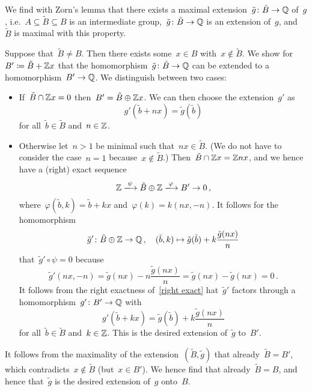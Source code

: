 We find with Zorn’s lemma that there exists a maximal extension~$\tilde{g} \colon \tilde{B} \to \mathbb{Q}$ of~$g$, i.e.~$A \subseteq \tilde{B} \subseteq B$ is an intermediate group,~$\tilde{g} \colon \tilde{B} \to \mathbb{Q}$ is an extension of~$g$, and~$\tilde{B}$ is maximal with this property.

Suppose that~$\tilde{B} \neq B$.
Then there exists some~$x \in B$ with~$x \notin \tilde{B}$.
We show for~$B' \coloneqq \tilde{B} + \mathbb{Z} x$ that the homomorphism~$\tilde{g} \colon \tilde{B} \to \mathbb{Q}$ can be extended to a homomorphism~$B' \to \mathbb{Q}$.
We distinguish between two cases:
\begin{itemize}
  \item
    If~$\tilde{B} \cap \mathbb{Z} x = 0$ then~$B' = \tilde{B} \oplus \mathbb{Z} x$.
    We can then choose the extension~$g'$ as
    \[
        g'(\tilde{b} + nx)
      = \tilde{g}(\tilde{b})
    \]
    for all~$\tilde{b} \in \tilde{B}$ and~$n \in \mathbb{Z}$.
  \item
    Otherwise let~$n > 1$ be minimal such that~$nx \in \tilde{B}$.
    (We do not have to consider the case~$n = 1$ because~$x \notin \tilde{B}$.)
    Then~$\tilde{B} \cap \mathbb{Z} x = \mathbb{Z} nx$, and we hence have a (right) exact sequence
    \begin{equation}
      \label{right exact}
      \Integer
      \xlongto{\psi}
      \tilde{B} \oplus \Integer
      \xlongto{\varphi}
      B'
      \to
      0 \,,
    \end{equation}
    where~$\varphi(\tilde{b},k) = \tilde{b}+kx$ and~$\varphi(k) = k(nx,-n)$.
    It follows for the homomorphism
    \[
      \tilde{g}'
      \colon
      \tilde{B} \oplus \mathbb{Z}
      \to
      \mathbb{Q} \,,
      \quad
      (\tilde{b},k)
      \mapsto
      \tilde{g}(\tilde{b}) + k \frac{\tilde{g}(nx)}{n}
    \]
    that~$\tilde{g}' \circ \psi = 0$ because
    \[
      \tilde{g}'(nx,-n)
      =
      \tilde{g}(nx) - n \frac{\tilde{g}(nx)}{n}
      =
      \tilde{g}(nx) - \tilde{g}(nx)
      =
      0 \,.
    \]
    It follows from the right exactness of~\eqref{right exact} hat~$\tilde{g}'$ factors through a homomorphism~$g' \colon B' \to \mathbb{Q}$ with
    \[
      g'(\tilde{b} + kx)
      =
      \tilde{g}(\tilde{b}) + k \frac{\tilde{g}(nx)}{n}
    \]
    for all~$\tilde{b} \in \tilde{B}$ and~$k \in \mathbb{Z}$.
    This is the desired extension of~$\tilde{g}$ to~$B'$.
\end{itemize}

It follows from the maximality of the extension~$(\tilde{B}, \tilde{g})$ that already~$\tilde{B} = B'$, which contradicts~$x \notin \tilde{B}$ (but~$x \in B'$).
We hence find that already~$\tilde{B} = B$, and hence that~$\tilde{g}$ is the desired extension of~$g$ onto~$B$.





